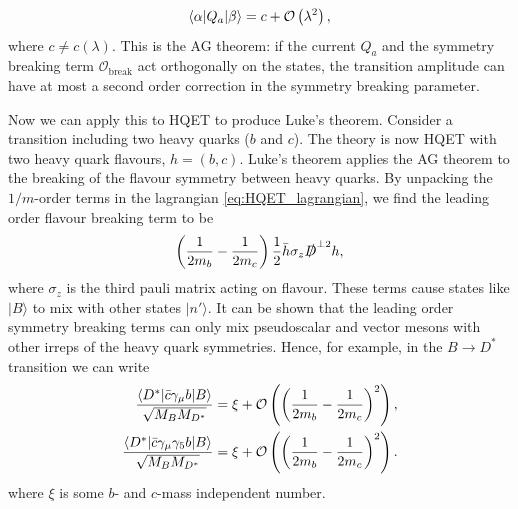 \begin{align}
  \langle \alpha | Q_a | \beta \rangle = c + \mathcal{O}\left( \lambda^2 \right),
\end{align}
where $c\neq c(\lambda)$. This is the AG theorem: if the current $Q_a$ and the symmetry breaking term $\mathcal{O}_{\text{break}}$ act orthogonally on the states, the transition amplitude can have at most a second order correction in the symmetry breaking parameter.

Now we can apply this to HQET to produce Luke's theorem. Consider a transition including two heavy quarks ($b$ and $c$). %
The theory is now HQET with two heavy quark flavours, $h=(b,c)$. Luke's theorem applies the AG theorem to the breaking of the flavour symmetry between heavy quarks. By unpacking the $1/m$-order terms in the lagrangian \eqref{eq:HQET_lagrangian}, we find the leading order flavour breaking term to be
\begin{align}
  \left({1\over 2m_b} - {1\over 2m_c} \right) {1\over 2} \bar{h} \sigma_z \slashed{D}^{\perp 2} h,
\end{align}
where $\sigma_z$ is the third pauli matrix acting on flavour. These terms cause states like $| B \rangle$ to mix with other states $|n'\rangle$. It can be shown \cite{Lebed:1991sq} that the leading order symmetry breaking terms can only mix pseudoscalar and vector mesons with other irreps of the heavy quark symmetries. Hence, for example, in the $B \to D^*$ transition we can write
\begin{align}
  {\langle D^* | \bar{c}\gamma_{\mu} b | B \rangle \over \sqrt{M_B M_{D^*}}} &= \xi + \mathcal{O}\left( \left( {1\over 2m_b} - {1\over 2m_c} \right)^2 \right), \\
  {\langle D^* | \bar{c}\gamma_{\mu}\gamma_5 b | B \rangle \over \sqrt{M_B M_{D^*}}} &= \xi + \mathcal{O}\left( \left( {1\over 2m_b} - {1\over 2m_c} \right)^2 \right).
\end{align}
where $\xi$ is some $b$- and $c$-mass independent number.

